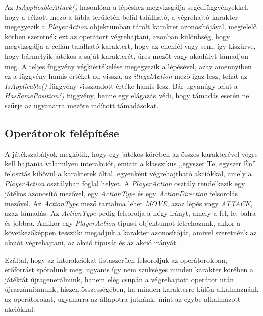 \documentclass[
]{thesis-ekf}
\theoremstyle{definition}
\theoremstyle{remark}
\begin{document}
Az \emph{IsApplicableAttack()} hasonlóan a lépéshez megvizsgálja segédfüggvényekkel, hogy a célzott mező a tábla területén belül található, a végrehajtó karakter megegyezik a \emph{PlayerAction} objektumban tárolt karakter azonosítójával, megfelelő körben szeretnék ezt az operátort végrehajtani, azonban különbség, hogy megvizsgálja a cellán található karaktert, hogy az ellenfél vagy sem, így kiszűrve, hogy bármelyik játékos a saját karakterét, üres mezőt vagy akadályt támadjon meg. A teljes függvény végkiértékelése megegyezik a lépésével, azaz amennyiben ez a függvény hamis értéket ad vissza, az \emph{illegalAction} mező igaz lesz, tehát az \emph{IsApplicable()} függvény visszaadott értéke hamis lesz. Bár ugyanúgy lefut a \emph{HasSamePosition()} függvény, benne egy elágazás védi, hogy támadás esetén ne szűrje az ugyanarra mezőre indított támadásokat.

\subsection{Operátorok felépítése} \label{operatorimp}

A játékszabályok megkötik, hogy egy játékos körében az összes karakterével végre kell hajtania valamilyen interakciót, emiatt a klasszikus ,,egyszer Te, egyszer Én'' felosztás kibővül a karakterek által, egyenként végrehajtható akciókkal, amely a \emph{PlayerAction} osztályban foglal helyet. A \emph{PlayerAction} osztály rendelkezik egy játékos azonosító mezővel, egy \emph{ActionType} és egy \emph{ActionDirection} felsorolás mezővel. Az \emph{ActionType} mező tartalma lehet \emph{MOVE}, azaz lépés vagy \emph{ATTACK}, azaz támadás. Az \emph{ActionType} pedig felsorolja a négy irányt, amely a fel, le, balra és jobbra. Amikor egy \emph{PlayerAction} típusú objektumot létrehozunk, akkor a következőképpen tesszük: megadjuk a karakter azonosítóját, amivel szeretnénk az akciót végrehajtani, az akció típusát és az akció irányát. 

Ezáltal, hogy az interakciókat listaszerűen felsoroljuk az operátorokban, erőforrást spórolunk meg, ugyanis így nem szükséges minden karakter körében a játékfát újragenerálnunk, hanem elég csupán a végrehajtott operátor után újraszámítanunk, hiszen összességében, ha minden karakterre külön alkalmaznánk az operátorokat, ugyanarra az állapotra jutnánk, mint az egybe alkalmazott akciókkal.
\end{document}
